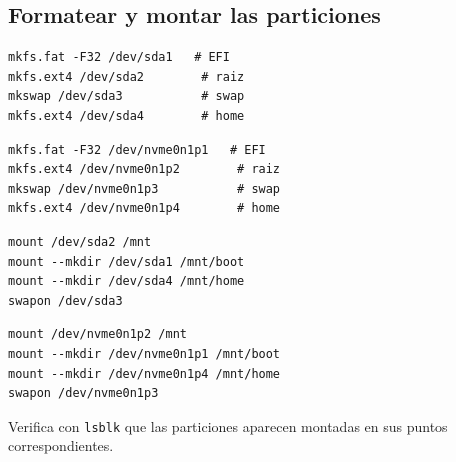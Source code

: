 \subsection{Formatear y montar las particiones}

\begin{tcolorbox}[title=Formateamos las particiones (GPT+EFI — SATA)]
\begin{lstlisting}[style=bashstyle]
mkfs.fat -F32 /dev/sda1   # EFI
mkfs.ext4 /dev/sda2        # raiz
mkswap /dev/sda3           # swap
mkfs.ext4 /dev/sda4        # home
\end{lstlisting}
\end{tcolorbox}

\begin{tcolorbox}[title=Formateamos las particiones (GPT+EFI — NVMe)]
\begin{lstlisting}[style=bashstyle]
mkfs.fat -F32 /dev/nvme0n1p1   # EFI
mkfs.ext4 /dev/nvme0n1p2        # raiz
mkswap /dev/nvme0n1p3           # swap
mkfs.ext4 /dev/nvme0n1p4        # home
\end{lstlisting}
\end{tcolorbox}

\begin{tcolorbox}[title=Montamos en \texttt{/mnt} — SATA]
\begin{lstlisting}[style=bashstyle]
mount /dev/sda2 /mnt
mount --mkdir /dev/sda1 /mnt/boot
mount --mkdir /dev/sda4 /mnt/home
swapon /dev/sda3
\end{lstlisting}
\end{tcolorbox}

\begin{tcolorbox}[title=Montamos en \texttt{/mnt} — NVMe]
\begin{lstlisting}[style=bashstyle]
mount /dev/nvme0n1p2 /mnt
mount --mkdir /dev/nvme0n1p1 /mnt/boot
mount --mkdir /dev/nvme0n1p4 /mnt/home
swapon /dev/nvme0n1p3
\end{lstlisting}
\tcblower
\scriptsize Verifica con \texttt{lsblk} que las particiones aparecen montadas en sus puntos correspondientes.
\end{tcolorbox}
\newpage
